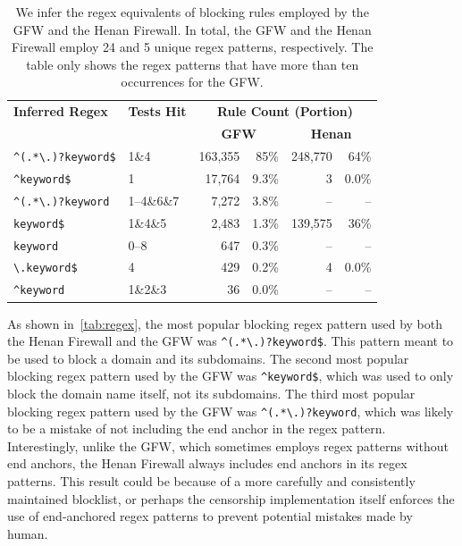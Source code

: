 \documentclass[conference,compsoc]{IEEEtran}
\begin{document}

\begin{table}[t]
  \centering
  \caption{
  We infer the regex equivalents of blocking rules employed by
  the GFW and the Henan Firewall.
  In total, the GFW and the Henan Firewall employ 24 and 5 unique regex patterns, respectively.
  The table only shows the regex patterns that have more than ten occurrences for the GFW.
  }
  {\setlength{\tabcolsep}{5pt} %
  \begin{tabular}{@{}llrrrr@{}}
    \toprule
    \textbf{Inferred Regex} & \textbf{Tests Hit} & \multicolumn{4}{c}{\textbf{Rule Count (Portion)}} \\
    \cmidrule(lr){3-6}
                           &                  & \multicolumn{2}{c}{\textbf{GFW}}   & \multicolumn{2}{c}{\textbf{Henan}}   \\
    \midrule
    \verb|^(.*\.)?keyword$|   &       1\&4             & 163,355 & 85\%  & 248,770 & 64\%  \\
    \verb|^keyword$|          &       1                & 17,764 & 9.3\%  & 3 & 0.0\%       \\
    \verb|^(.*\.)?keyword|    &       1--4\&6\&7       & 7,272 & 3.8\%   & --  & --            \\
    \verb|keyword$|           &       1\&4\&5          & 2,483 & 1.3\%   & 139,575 & 36\%  \\
    \verb|keyword|            &       0--8             & 647 & 0.3\%     & --  & --            \\
    \verb|\.keyword$|         &       4                & 429 & 0.2\%     & 4 & 0.0\%       \\
    \verb|^keyword|           &       1\&2\&3          & 36 & 0.0\%     & --  & --            \\
    \bottomrule
  \end{tabular}
  }
  \label{tab:regex}
\end{table}

As shown in~\autoref{tab:regex},
the most popular blocking regex pattern used by both the Henan Firewall and the GFW
was \verb|^(.*\.)?keyword$|.
This pattern meant to be used to block a domain and its subdomains.
The second most popular blocking regex pattern used by the GFW was \verb|^keyword$|,
which was used to only block the domain name itself, not its subdomains.
The third most popular blocking regex pattern used by the GFW was \verb|^(.*\.)?keyword|,
which was likely to be a mistake of not including the end anchor in the regex pattern.
Interestingly,
unlike the GFW, which sometimes employs regex patterns without end anchors,
the Henan Firewall always includes end anchors in its regex patterns.
This result could be because of a more carefully and consistently maintained blocklist,
or perhaps the censorship implementation itself enforces the use of end-anchored regex patterns to prevent potential mistakes made by human.
\end{document}
